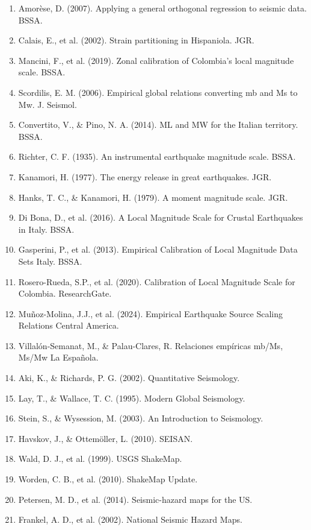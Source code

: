 \documentclass[12pt,a4paper]{article}
\begin{document}
\begin{enumerate}
    \item Amorèse, D. (2007). Applying a general orthogonal regression to seismic data. BSSA.
    \item Calais, E., et al. (2002). Strain partitioning in Hispaniola. JGR.
    \item Mancini, F., et al. (2019). Zonal calibration of Colombia’s local magnitude scale. BSSA.
    \item Scordilis, E. M. (2006). Empirical global relations converting mb and Ms to Mw. J. Seismol.
    \item Convertito, V., \& Pino, N. A. (2014). ML and MW for the Italian territory. BSSA.
    \item Richter, C. F. (1935). An instrumental earthquake magnitude scale. BSSA.
    \item Kanamori, H. (1977). The energy release in great earthquakes. JGR.
    \item Hanks, T. C., \& Kanamori, H. (1979). A moment magnitude scale. JGR.
    \item Di Bona, D., et al. (2016). A Local Magnitude Scale for Crustal Earthquakes in Italy. BSSA.
    \item Gasperini, P., et al. (2013). Empirical Calibration of Local Magnitude Data Sets Italy. BSSA.
    \item Rosero-Rueda, S.P., et al. (2020). Calibration of Local Magnitude Scale for Colombia. ResearchGate.
    \item Muñoz-Molina, J.J., et al. (2024). Empirical Earthquake Source Scaling Relations Central America.
    \item Villalón-Semanat, M., \& Palau-Clares, R. Relaciones empíricas mb/Ms, Ms/Mw La Española.
    \item Aki, K., \& Richards, P. G. (2002). Quantitative Seismology.
    \item Lay, T., \& Wallace, T. C. (1995). Modern Global Seismology.
    \item Stein, S., \& Wysession, M. (2003). An Introduction to Seismology.
    \item Havskov, J., \& Ottemöller, L. (2010). SEISAN.
    \item Wald, D. J., et al. (1999). USGS ShakeMap.
    \item Worden, C. B., et al. (2010). ShakeMap Update.
    \item Petersen, M. D., et al. (2014). Seismic-hazard maps for the US.
    \item Frankel, A. D., et al. (2002). National Seismic Hazard Maps.

\end{enumerate}
\end{document}
